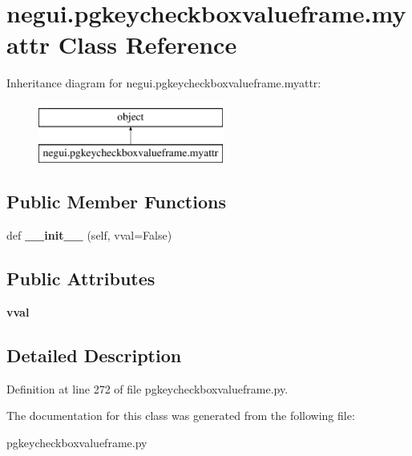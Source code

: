 \hypertarget{classnegui_1_1pgkeycheckboxvalueframe_1_1myattr}{}\section{negui.\+pgkeycheckboxvalueframe.\+myattr Class Reference}
\label{classnegui_1_1pgkeycheckboxvalueframe_1_1myattr}
Inheritance diagram for negui.\+pgkeycheckboxvalueframe.\+myattr\+:\begin{figure}[H]
\begin{center}
\leavevmode
\includegraphics[height=2.000000cm]{classnegui_1_1pgkeycheckboxvalueframe_1_1myattr}
\end{center}
\end{figure}
\subsection*{Public Member Functions}
\begin{DoxyCompactItemize}
\item 
def {\bfseries \+\_\+\+\_\+init\+\_\+\+\_\+} (self, vval=False)\hypertarget{classnegui_1_1pgkeycheckboxvalueframe_1_1myattr_a6130ccf2471559655c3b4ecfe09d43d5}{}\label{classnegui_1_1pgkeycheckboxvalueframe_1_1myattr_a6130ccf2471559655c3b4ecfe09d43d5}

\end{DoxyCompactItemize}
\subsection*{Public Attributes}
\begin{DoxyCompactItemize}
\item 
{\bfseries vval}\hypertarget{classnegui_1_1pgkeycheckboxvalueframe_1_1myattr_a2e3ac14c8f3febe2a11f47706175891c}{}\label{classnegui_1_1pgkeycheckboxvalueframe_1_1myattr_a2e3ac14c8f3febe2a11f47706175891c}

\end{DoxyCompactItemize}


\subsection{Detailed Description}


Definition at line 272 of file pgkeycheckboxvalueframe.\+py.



The documentation for this class was generated from the following file\+:\begin{DoxyCompactItemize}
\item 
pgkeycheckboxvalueframe.\+py\end{DoxyCompactItemize}
